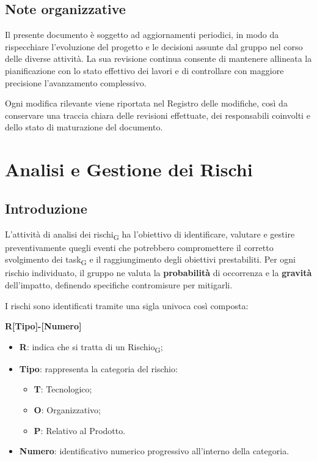 ﻿\documentclass[a4paper, 10pt, colorlinks=true, linkcolor=black, urlcolor=blue, citecolor=blue, hidelinks]{article}
\begin{document}
\subsection{Note organizzative}

Il presente documento è soggetto ad aggiornamenti periodici, in modo da rispecchiare l'evoluzione del progetto e le decisioni assunte dal gruppo nel corso delle diverse attività. La sua revisione continua consente di mantenere allineata la pianificazione con lo stato effettivo dei lavori e di controllare con maggiore precisione l'avanzamento complessivo.

Ogni modifica rilevante viene riportata nel Registro delle modifiche, così da conservare una traccia chiara delle revisioni effettuate, dei responsabili coinvolti e dello stato di maturazione del documento.

\newpage

\section{Analisi e Gestione dei Rischi}
\label{tab:gestione-rischi}

\subsection{Introduzione}

L'attività di analisi dei rischi\textsubscript{G} ha l'obiettivo di identificare, valutare e gestire preventivamente quegli eventi che potrebbero compromettere il corretto svolgimento dei task\textsubscript{G} e il raggiungimento degli obiettivi prestabiliti. 
Per ogni rischio individuato, il gruppo ne valuta la \textbf{probabilità} di occorrenza e la \textbf{gravità} dell'impatto, definendo specifiche contromisure per mitigarli.

I rischi sono identificati tramite una sigla univoca così composta: \\
\centerline{\textbf{R[Tipo]-[Numero]}}
\begin{itemize}
    \item \textbf{R}: indica che si tratta di un Rischio\textsubscript{G};
    \item \textbf{Tipo}: rappresenta la categoria del rischio:
    \begin{itemize}
        \item \textbf{T}: Tecnologico;
        \item \textbf{O}: Organizzativo;
        \item \textbf{P}: Relativo al Prodotto.
    \end{itemize}
    \item \textbf{Numero}: identificativo numerico progressivo all'interno della categoria.
\end{itemize}
\end{document}
